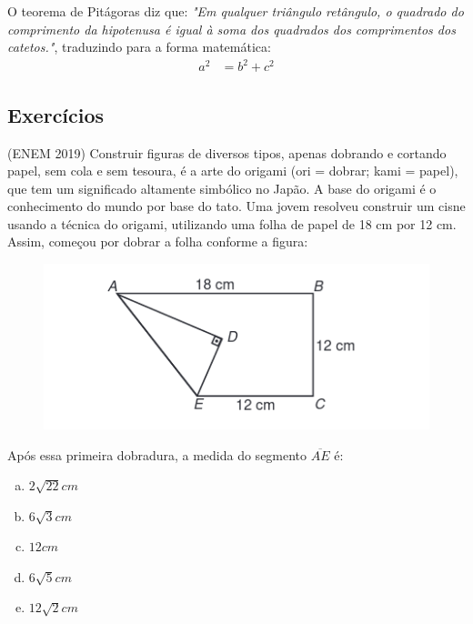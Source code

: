 \begin{multicols*}{2}
    O teorema de Pitágoras diz que: \textit{"Em qualquer triângulo retângulo, o quadrado do comprimento da hipotenusa é 
    igual à soma dos quadrados dos comprimentos dos catetos."}, traduzindo para 
    a forma matemática: 
    \begin{align}
        a^2 &= b^2 + c^2
    \end{align}



    \subsection*{Exercícios}

    \noindent
    \execnum (ENEM 2019) Construir figuras de diversos tipos, apenas dobrando e cortando papel, 
    sem cola e sem tesoura, é a arte do origami (ori = dobrar; kami = papel), 
    que tem um significado altamente simbólico no Japão. A base do origami é o 
    conhecimento do mundo por base do tato. Uma jovem resolveu construir um
    cisne usando a técnica do origami, utilizando uma folha de papel de 18 cm 
    por 12 cm. Assim, começou por dobrar a folha conforme a figura:

    \begin{figure}[H]
        \includegraphics[width=\columnwidth]{assets/enem2019-171.png}
    \end{figure}

    \noindent 
    Após  essa  primeira  dobradura,  a  medida  do  segmento $\overline{AE}$ é:
    \begin{enumerate}[(a)]
        \item $2\sqrt{22}cm$
        \item $6\sqrt{3}cm$
        \item $12cm$
        \item $6\sqrt{5}cm$
        \item $12\sqrt{2}cm$
    \end{enumerate}


\end{multicols*}
